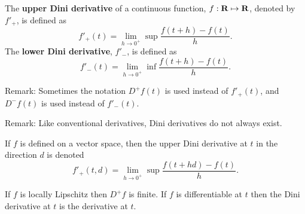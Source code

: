 \documentclass[12pt]{article}
\begin{document}
The {\bf upper Dini derivative} of a continuous function, $f:{\bf R} \mapsto {\bf R}$, denoted by $f'_+$, is defined as
$$
    f'_+(t) = \lim_{h\rightarrow 0^+} \sup \frac{f(t + h) - f(t)}{h}.
$$
The {\bf lower Dini derivative}, $f'_-$, is defined as
$$
    f'_-(t) = \lim_{h\rightarrow 0^+} \inf \frac{f(t + h) - f(t)}{h}.
$$

Remark: Sometimes the notation $D^+ f(t)$ is used instead of $f'_+(t)$, and $D^- f(t)$ is used instead of $f'_-(t)$.

Remark: Like conventional derivatives, Dini derivatives do not always exist.

If $f$ is defined on a vector space, then the upper Dini derivative at $t$ in the direction $d$ is denoted
$$
    f'_+ (t,d) = \lim_{h\rightarrow 0^+} \sup \frac{f(t + hd) - f(t)}{h}.
$$

If $f$ is locally Lipschitz then $D^+ f$ is finite.  If $f$ is differentiable at $t$ then the Dini derivative at $t$ is the derivative at $t$.
\end{document}
